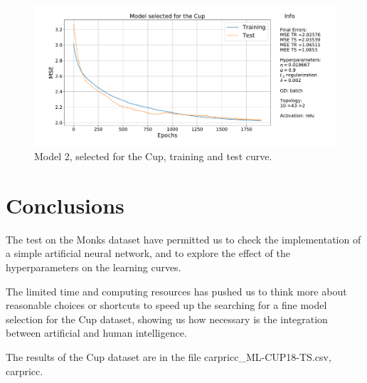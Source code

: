 \documentclass[11pt,twoside]{article}
\begin{document}
\begin{figure}[htbp]
  \centering
  \includegraphics[width=1.0\textwidth]{img/final_model.pdf}
\caption{Model 2, selected for the Cup, training and test curve.}
\label{fig:initial-grid}
  \end{figure}





\clearpage

\section{Conclusions} %
\label{sec:conclusions}

The test on the Monks dataset have permitted us to check the implementation of a simple artificial neural network, and to explore the effect of the hyperparameters on the learning curves.

The limited time and computing resources has pushed us to think more about reasonable choices or shortcuts to speed up the searching for a fine model selection for the Cup dataset, showing us how necessary is the integration between artificial and human intelligence.

The results of the Cup dataset are in the file carpricc\_ML-CUP18-TS.csv, carpricc.






\end{document}
